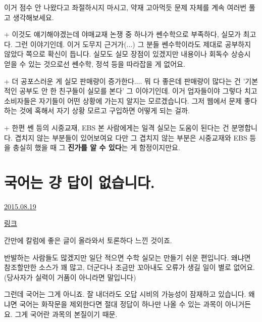 이거 점수 안 나왔다고 좌절하시지 마시고, 약재 고아먹듯 문제 자체를 계속 여러번 풀고 생각해보세요.
\vspace{5mm}

+ 이것도 얘기해야겠는데 야매교재 논쟁 중 하나가
쎈수학으로 부족하다, 실모가 최고다. 그런 이야기인데. 이거 도무지 근거가(...)
그 분들 쎈수학이라도 제대로 공부하지 않았다 쪽으로 확신이 듭니다.
실모도 실모 장점이 있겠지만 내용이나 회독수 상승시 얻을 수 있는 것으로선 쎈수학, 정석 등을 따라잡을 게 없어요.
\vspace{5mm}

+ 더 공포스러운 게 실모 판매량이 증가한다.... 뭐 다 좋은데
판매량이 많다는 건 '기본적인 공부도 안 한 친구들이 실모를 본다' 그 이야기인데.
이거 업자들이야 그렇다 치고 소비자들은 자기들이 어떤 상황에 가는지 알지는 모르겠습니다.
그저 웹에서 문제 좋다 하는 것에 혹해서 자기 상황 모르고 구입하면 어떻게 되는 걸까.
\vspace{5mm}

+ 한편 쎈 등의 시중교재, EBS 본 사람에게는 일격 실모는 도움이 된다는 건 분명합니다.  겹치지 않는 부분들이 있어보여요
다만 그 겹치지 않는 부분은 시중교재와 EBS 등을 충실히 했을 때 그 \textbf{진가를 알 수 있다}는 게 함정이지만요.
\vspace{5mm}







\section{국어는 걍 답이 없습니다.}
\href{https://www.kockoc.com/Apoc/261711}{2015.08.19}

\vspace{5mm}

\href{http://kockoc.com/column/261153}{링크}
\vspace{5mm}

간만에 칼럼에 좋은 글이 올라와서 토론하다 느낀 것이죠.
\vspace{5mm}

반발하는 사람들도 많겠지만 일단 적으면
수학 실모는 만들기 쉬운 편입니다. 왜냐면 참조할만한 소스가 꽤 많고, 더군다나 조금만 꼬아내도 오류가 생길 일이 별로 없어요.
(당사자가 실력이 거품이 아니라면 말입니다)
\vspace{5mm}

그런데 국어는 그게 아니죠. 잘 내더라도 오답 시비의 가능성이 잠재하고 있습니다.
왜냐면 국어는 화작문을 제외한다면 절대 정답이 하나만 나올 수 있는 과목이 아니거든요.
그게 국어란 과목의 본질이기 때문.
\vspace{5mm}

